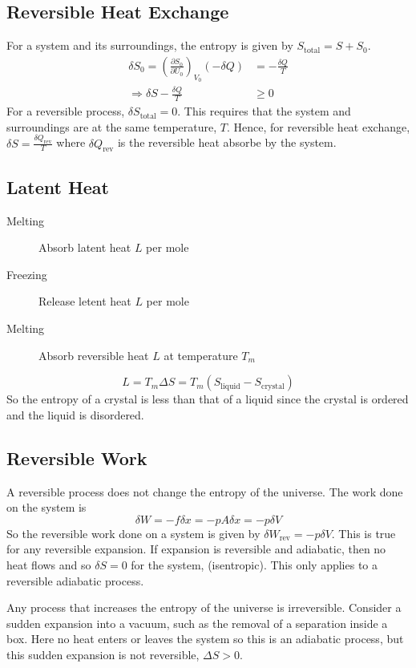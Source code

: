 \documentclass[british]{article}
\newcommand{\pd}[2]{\frac{\partial #1}{\partial #2}} %
\begin{document}
\subsection{Reversible Heat Exchange}
For a system and its surroundings, the entropy is given by $S_\text{total}=S+S_0$.
\begin{align*}
	\delta S_0 = \left(\pd{S_0}{U_0}\right)_{V_0} (-\delta Q) &= -\frac{\delta Q}{T} \\
	\Rightarrow \delta S - \frac{\delta Q}{T} &\ge 0
\end{align*}
For a reversible process, $\delta S_\text{total}=0$. This requires that the system and surroundings are at the same temperature, $T$. Hence, for reversible heat exchange, $\delta S = \frac{\delta Q_\text{rev}}{T}$ where $\delta Q_\text{rev}$ is the reversible heat absorbe by the system.

\subsection{Latent Heat}
\begin{description}
	\item[Melting] Absorb latent heat $L$ per mole
	\item[Freezing] Release letent heat $L$ per mole
	\item[Melting] Absorb reversible heat $L$ at temperature $T_m$ 
\end{description}
\[
	L = T_m \Delta S = T_m(S_\text{liquid} - S_\text{crystal})
\]
So the entropy of a crystal is less than that of a liquid since the crystal is ordered and the liquid is disordered.

\subsection{Reversible Work}
A reversible process does not change the entropy of the universe. The work done on the system is 
\[
	\delta W = -f\delta x = -pA\delta x = -p\delta V
\]
So the reversible work done on a system is given by $\delta W_\text{rev} = -p\delta V$. This is true for any reversible expansion. If expansion is reversible and adiabatic, then no heat flows and so $\delta S =0$ for the system, (isentropic). This only applies to a reversible adiabatic process.

Any process that increases the entropy of the universe is irreversible. Consider a sudden expansion into a vacuum, such as the removal of a separation inside a box. Here no heat enters or leaves the system so this is an adiabatic process, but this sudden expansion is not reversible, $\Delta S > 0$.
\end{document}

